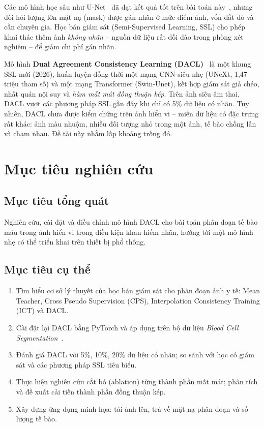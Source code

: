 \documentclass[12pt,a4paper]{article}
\begin{document}
Các mô hình học sâu như U-Net~\cite{ronneberger2015unet} đã đạt kết quả tốt trên bài
toán này~\cite{depto2021blood}, nhưng đòi hỏi lượng lớn mặt nạ (mask) được gán nhãn ở mức
điểm ảnh, vốn đắt đỏ và cần chuyên gia. Học bán giám sát (Semi-Supervised Learning, SSL)
cho phép khai thác thêm ảnh \emph{không nhãn} -- nguồn dữ liệu rất dồi dào trong phòng
xét nghiệm -- để giảm chi phí gán nhãn.

Mô hình \textbf{Dual Agreement Consistency Learning (DACL)}~\cite{wang2026dacl} là một
khung SSL mới (2026), huấn luyện đồng thời một mạng CNN siêu nhẹ (UNeXt, 1{,}47 triệu
tham số) và một mạng Transformer (Swin-Unet), kết hợp giám sát giả chéo, nhất quán nội
suy và \emph{hàm mất mát đồng thuận kép}. Trên ảnh siêu âm thai, DACL vượt các phương
pháp SSL gần đây khi chỉ có 5\% dữ liệu có nhãn. Tuy nhiên, DACL chưa được kiểm chứng
trên ảnh hiển vi -- miền dữ liệu có đặc trưng rất khác: ảnh màu nhuộm, nhiều đối tượng
nhỏ trong một ảnh, tế bào chồng lấn và chạm nhau. Đề tài này nhằm lấp khoảng trống đó.

\section{Mục tiêu nghiên cứu}

\subsection{Mục tiêu tổng quát}
Nghiên cứu, cài đặt và điều chỉnh mô hình DACL cho bài toán phân đoạn tế bào máu trong
ảnh hiển vi trong điều kiện khan hiếm nhãn, hướng tới một mô hình nhẹ có thể triển khai
trên thiết bị phổ thông.

\subsection{Mục tiêu cụ thể}
\begin{enumerate}
  \item Tìm hiểu cơ sở lý thuyết của học bán giám sát cho phân đoạn ảnh y tế: Mean Teacher,
        Cross Pseudo Supervision (CPS), Interpolation Consistency Training (ICT) và DACL.
  \item Cài đặt lại DACL bằng PyTorch và áp dụng trên bộ dữ liệu
        \emph{Blood Cell Segmentation}~\cite{depto2021blood}.
  \item Đánh giá DACL với 5\%, 10\%, 20\% dữ liệu có nhãn; so sánh với học có giám sát
        và các phương pháp SSL tiêu biểu.
  \item Thực hiện nghiên cứu cắt bỏ (ablation) từng thành phần mất mát; phân tích và đề
        xuất cải tiến thành phần đồng thuận kép.
  \item Xây dựng ứng dụng minh họa: tải ảnh lên, trả về mặt nạ phân đoạn và số lượng tế bào.
\end{enumerate}
\end{document}
